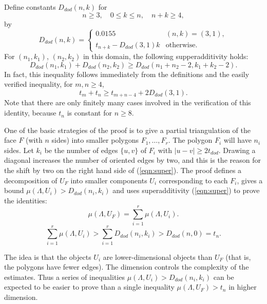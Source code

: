 \documentclass{article} %
\begin{document}
Define constants $D_{dod}(n,k)$ for
  $$
  n \ge 3,\quad 0\le k \le n,\quad n+k\ge 4,
  $$
by
   $$
   D_{dod}(n,k) =\begin{cases} 0.0155 & (n,k) = (3,1),\\
     t_{n+k} - D_{dod}(3,1)k & \text{otherwise}.
    \end{cases}
   $$
For $(n_1,k_1)$, $(n_2,k_2)$ in this domain,
the following supperadditivity holds:
\begin{equation}\label{eqn:super}
  D_{dod}(n_1,k_1) + D_{dod}(n_2,k_2) \ge D_{dod}(n_1+n_2-2,k_1+k_2-2).
\end{equation}
In fact, this inequality follows immediately from the definitions and the
easily verified inequality,
for $m,n\ge 4$,
$$
t_m + t_n \ge t_{m+n-4} + 2 D_{dod}(3,1).
$$
Note that there are only finitely many cases involved in the
verification of this identity,
because $t_n$ is constant for $n\ge 8$.


One of the basic strategies of the proof is to give a partial triangulation
of the face $F$ (with $n$ sides)
into smaller polygons $F_1,\ldots,F_r$.   The polygon
$F_i$ will have $n_i$ sides.  Let %
$k_i$ be the number of edges $\{u,v\}$ of $F_i$ with $|u-v|\ge 2t_{dod}$.
Drawing a diagonal increases the number of oriented edges by
two, and this is the reason for the shift by two on the right
hand side of (\ref{eqn:super}).   The proof defines
a decomposition of $U_F$ into smaller components $U_i$ corresponding
to each $F_i$, gives a bound $\mu(\Lambda,U_i) > D_{dod}(n_i,k_i)$
and uses superadditivity (\ref{eqn:super}) to prove the identities:
\begin{equation}\label{eqn:mu}
  \mu(\Lambda,U_F) = \sum_{i=1}^r \mu(\Lambda,U_i).
\end{equation}
\begin{equation}\label{eqn:super-mu}
\sum_{i=1}^r \mu(\Lambda,U_i) > \sum_{i=1}^r D_{dod}(n_i,k_i)
 > D_{dod}(n,0) = t_n.
\end{equation}

The idea is that the objects $U_i$ are lower-dimensional objects
than $U_F$ (that is, the polygons  have fewer edges).
The dimension controls the complexity
of the estimates.  Thus a series of inequalities $\mu(\Lambda,U_i) > D_{dod}(n_i,k_i)$
can be expected to be easier to prove than a single inequality
$\mu(\Lambda,U_F) > t_n$ in higher dimension.  
\end{document}
